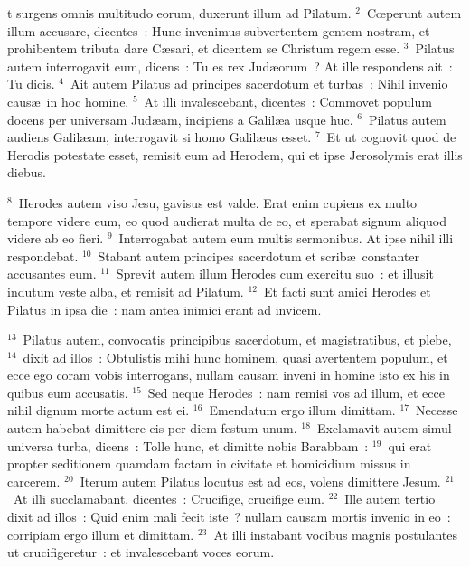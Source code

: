 \bchapter
{}t surgens omnis multitudo eorum, duxerunt illum ad Pilatum.
${}^{2}$~Cœperunt autem illum accusare, dicentes~: Hunc invenimus subvertentem gentem nostram, et prohibentem tributa dare C\ae sari, et dicentem se Christum regem esse.
${}^{3}$~Pilatus autem interrogavit eum, dicens~: Tu es rex Jud\ae orum~? At ille respondens ait~: Tu dicis.
${}^{4}$~Ait autem Pilatus ad principes sacerdotum et turbas~: Nihil invenio caus\ae\ in hoc homine.
${}^{5}$~At illi invalescebant, dicentes~: Commovet populum docens per universam Jud\ae am, incipiens a Galil\ae a usque huc.
${}^{6}$~Pilatus autem audiens Galil\ae am, interrogavit si homo Galil\ae us esset.
${}^{7}$~Et ut cognovit quod de Herodis potestate esset, remisit eum ad Herodem, qui et ipse Jerosolymis erat illis diebus.


${}^{8}$~Herodes autem viso Jesu, gavisus est valde. Erat enim cupiens ex multo tempore videre eum, eo quod audierat multa de eo, et sperabat signum aliquod videre ab eo fieri.
${}^{9}$~Interrogabat autem eum multis sermonibus. At ipse nihil illi respondebat.
${}^{10}$~Stabant autem principes sacerdotum et scrib\ae\ constanter accusantes eum.
${}^{11}$~Sprevit autem illum Herodes cum exercitu suo~: et illusit indutum veste alba, et remisit ad Pilatum.
${}^{12}$~Et facti sunt amici Herodes et Pilatus in ipsa die~: nam antea inimici erant ad invicem.


${}^{13}$~Pilatus autem, convocatis principibus sacerdotum, et magistratibus, et plebe,
${}^{14}$~dixit ad illos~: Obtulistis mihi hunc hominem, quasi avertentem populum, et ecce ego coram vobis interrogans, nullam causam inveni in homine isto ex his in quibus eum accusatis.
${}^{15}$~Sed neque Herodes~: nam remisi vos ad illum, et ecce nihil dignum morte actum est ei.
${}^{16}$~Emendatum ergo illum dimittam.
${}^{17}$~Necesse autem habebat dimittere eis per diem festum unum.
${}^{18}$~Exclamavit autem simul universa turba, dicens~: Tolle hunc, et dimitte nobis Barabbam~:
${}^{19}$~qui erat propter seditionem quamdam factam in civitate et homicidium missus in carcerem.
${}^{20}$~Iterum autem Pilatus locutus est ad eos, volens dimittere Jesum.
${}^{21}$~At illi succlamabant, dicentes~: Crucifige, crucifige eum.
${}^{22}$~Ille autem tertio dixit ad illos~: Quid enim mali fecit iste~? nullam causam mortis invenio in eo~: corripiam ergo illum et dimittam.
${}^{23}$~At illi instabant vocibus magnis postulantes ut crucifigeretur~: et invalescebant voces eorum.


